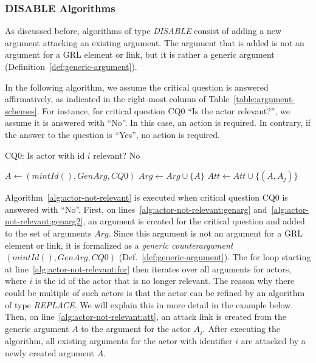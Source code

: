 \subsubsection{DISABLE Algorithms}
\label{sect:formalframework:disable}
As discussed before, algorithms of type \emph{DISABLE} consist of adding a new argument attacking an existing argument. The argument that is added is not an argument for a GRL element or link, but it is rather a generic argument (Definition~\ref{def:generic-argument}).

In the following algorithm, we assume the critical question is answered affirmatively, as indicated in the right-most column of Table~\ref{table:argument-schemes}. For instance, for critical question CQ0 ``Is the actor relevant?'', we assume it is answered with ``No''. In this case, an action is required. In contrary, if the answer to the question is ``Yes'', no action is required.

\begin{algorithm}[h]
  \caption{CQ0: Is actor with id $i$ relevant? No}\label{alg:actor-not-relevant}
  \begin{algorithmic}[1]
    \State $A \leftarrow (mintId(),GenArg,CQ0)$\label{alg:actor-not-relevant:genarg}
    \State $Arg\leftarrow Arg \cup \{A\}$\label{alg:actor-not-relevant:genarg2}
    \label{alg:actor-not-relevant:for}
      \State $Att \leftarrow Att \cup \{(A,A_j)\}$\label{alg:actor-not-relevant:att}
    \EndFor
    \EndProcedure
  \end{algorithmic}
\end{algorithm}

Algorithm~\ref{alg:actor-not-relevant} is executed when critical question CQ0 is answered with ``No''. First, on lines~\ref{alg:actor-not-relevant:genarg} and~\ref{alg:actor-not-relevant:genarg2}, an argument is created for the critical question and added to the set of arguments $Arg$. Since this argument is not an argument for a GRL element or link, it is formalized as a \emph{generic counterargument} $(mintId(), GenArg, CQ0)$ (Def.~\ref{def:generic-argument}). The for loop starting at line~\ref{alg:actor-not-relevant:for} then iterates over all arguments for actors, where $i$ is the id of the actor that is no longer relevant. The reason why there could be multiple of such actors is that the actor can be refined by an algorithm of type \emph{REPLACE}. We will explain this in more detail in the example below. Then, on line~\ref{alg:actor-not-relevant:att}, an attack link is created from the generic argument $A$ to the argument for the actor $A_j$. After executing the algorithm, all existing arguments for the actor with identifier $i$ are attacked by a newly created argument $A$.

